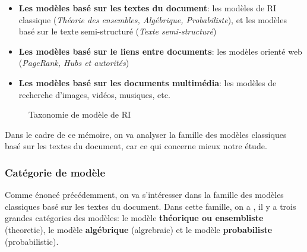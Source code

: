 \begin{itemize}
    \item \textbf{Les modèles basé sur les textes du document}: les modèles de RI classique (\textit{Théorie des ensembles, Algébrique, Probabiliste}), et les modèles basé sur le texte semi-structuré (\textit{Texte semi-structuré})
    \item \textbf{Les modèles basé sur le liens entre documents}: les modèles orienté web (\textit{PageRank, Hubs et autorités})
    \item \textbf{Les modèles basé sur les documents multimédia}: les modèles de recherche d'images, vidéos, musiques, etc.
\end{itemize}

\begin{figure}[htbp]
    \begin{center}
        \caption{Taxonomie de modèle de RI \citep{soulier2014:def-evaluation-modele}}
    \end{center}
    \label{modele-ri}
\end{figure}

Dans le cadre de ce mémoire, on va analyser la famille des modèles classiques basé sur les textes du document, car ce qui concerne mieux notre étude.

\subsubsection{Catégorie de modèle}
Comme énoncé précédemment, on va s’intéresser dans la famille des modèles classiques basé sur les textes du document. Dans cette famille, on a \citep*{modern-ir, approche-semantique,soulier2014:def-evaluation-modele}, il y a trois grandes catégories des modèles: le modèle \textbf{théorique ou ensembliste} (theoretic), le modèle \textbf{algébrique} (algrebraic) et le modèle \textbf{probabiliste} (probabilistic).

